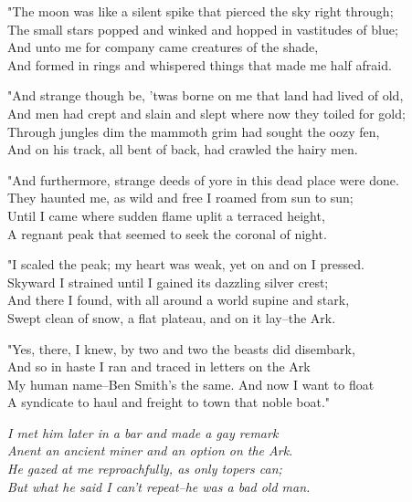 \begin{poemblock}
"The moon was like a silent spike that pierced the sky right through;\\
The small stars popped and winked and hopped in vastitudes of blue;\\
And unto me for company came creatures of the shade,\\
And formed in rings and whispered things that made me half afraid.

"And strange though be, 'twas borne on me that land had lived of old,\\
And men had crept and slain and slept where now they toiled for gold;\\
Through jungles dim the mammoth grim had sought the oozy fen,\\
And on his track, all bent of back, had crawled the hairy men.

"And furthermore, strange deeds of yore in this dead place were done.\\
They haunted me, as wild and free I roamed from sun to sun;\\
Until I came where sudden flame uplit a terraced height,\\
A regnant peak that seemed to seek the coronal of night.

"I scaled the peak; my heart was weak, yet on and on I pressed.\\
Skyward I strained until I gained its dazzling silver crest;\\
And there I found, with all around a world supine and stark,\\
Swept clean of snow, a flat plateau, and on it lay--the Ark.

"Yes, there, I knew, by two and two the beasts did disembark,\\
And so in haste I ran and traced in letters on the Ark\\
My human name--Ben Smith's the same.  And now I want to float\\
A syndicate to haul and freight to town that noble boat."

\textit{
\idt I met him later in a bar and made a gay remark\\
\idt Anent an ancient miner and an option on the Ark.\\
\idt He gazed at me reproachfully, as only topers can;\\
\idt But what he said I can't repeat--he was a bad old man.
}

\end{poemblock}
